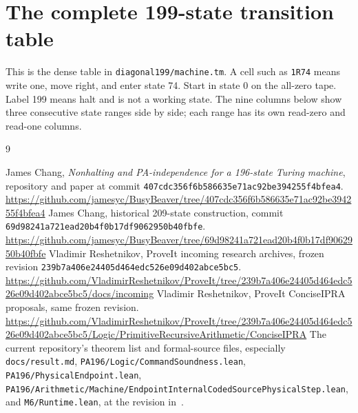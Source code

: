 \documentclass[11pt,letterpaper]{article}
\begin{document}





\clearpage
\appendix
\section{The complete 199-state transition table}
This is the dense table in \texttt{diagonal199/machine.tm}. A cell such as \texttt{1R74} means write one, move right, and enter state 74. Start in state 0 on the all-zero tape. Label 199 means halt and is not a working state. The nine columns below show three consecutive state ranges side by side; each range has its own read-zero and read-one columns.

\clearpage
\begin{thebibliography}{9}
\small\raggedright
{} James Chang, \emph{Nonhalting and PA-independence for a 196-state Turing machine}, repository and paper at commit \texttt{407cdc356f6b586635e71ac92be394255f4bfea4}.\newline
\url{https://github.com/jamesyc/BusyBeaver/tree/407cdc356f6b586635e71ac92be394255f4bfea4}
 James Chang, historical 209-state construction, commit \texttt{69d98241a721ead20b4f0b17df9062950b40fbfe}.\newline
\url{https://github.com/jamesyc/BusyBeaver/tree/69d98241a721ead20b4f0b17df9062950b40fbfe}
 Vladimir Reshetnikov, ProveIt incoming research archives, frozen revision \texttt{239b7a406e24405d464edc526e09d402abce5bc5}.\newline
\url{https://github.com/VladimirReshetnikov/ProveIt/tree/239b7a406e24405d464edc526e09d402abce5bc5/docs/incoming}
 Vladimir Reshetnikov, ProveIt ConciseIPRA proposals, same frozen revision.\newline
\url{https://github.com/VladimirReshetnikov/ProveIt/tree/239b7a406e24405d464edc526e09d402abce5bc5/Logic/PrimitiveRecursiveArithmetic/ConciseIPRA}
 The current repository's theorem list and formal-source files, especially \texttt{docs/result.md}, \texttt{PA196/Logic/CommandSoundness.lean}, \texttt{PA196/PhysicalEndpoint.lean}, \texttt{PA196/Arithmetic/Machine/EndpointInternalCodedSourcePhysicalStep.lean}, and \texttt{M6/Runtime.lean}, at the revision in~\cite{current}.
\end{thebibliography}
\end{document}
